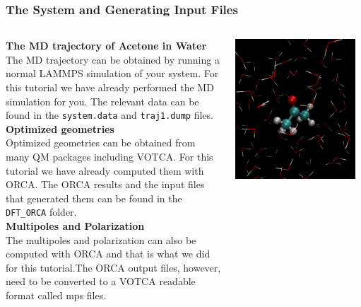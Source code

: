 \documentclass[t,aspectratio=169, 8pt]{beamer}
\begin{document}
\begin{frame}[fragile]
  \frametitle{The System and Generating Input Files}
  \begin{columns}[b]
    \begin{column}{0.58\textwidth}
      \textbf{The MD trajectory of Acetone in Water}\\
      The MD trajectory can be obtained by running a normal LAMMPS simulation of your system. For this tutorial we have already performed the MD simulation for you. The relevant data can be found in the \texttt{system.data} and \texttt{traj1.dump} files.
      \vspace{0.3cm}\\
      \textbf{Optimized geometries}\\
      Optimized geometries can be obtained from many QM packages including VOTCA. For this tutorial we have already computed them with ORCA. The ORCA results and the input files that generated them can be found in the \texttt{DFT_ORCA} folder.
      \vspace{0.3cm}\\
      \textbf{Multipoles and Polarization}\\
      The multipoles and polarization can also be computed with ORCA and that is what we did for this tutorial.The ORCA output files, however, need to be converted to a VOTCA readable format called mps files.
    \end{column}
    \begin{column}{0.4\textwidth}
      \includegraphics[width=0.95\textwidth]{system}
    \end{column}
  \end{columns}
\end{frame}
\end{document}
